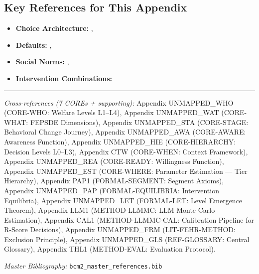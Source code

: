\subsection{Key References for This Appendix}

\begin{itemize}[nosep]
    \item \textbf{Choice Architecture:} \citet{thalersunstein2008}, \citet{johnson2012}
    \item \textbf{Defaults:} \citet{madrian2001}, \citet{chetty2014}
    \item \textbf{Social Norms:} \citet{allcott2011}, \citet{cialdini2003}
    \item \textbf{Intervention Combinations:} \citet{johnson2021}
\end{itemize}

\nocite{bcm_master}



\vspace{1em}
\hrule
\vspace{0.5em}

\noindent\textit{Cross-references (7 COREs + supporting):}
Appendix UNMAPPED_WHO (CORE-WHO: Welfare Levels L1--L4),
Appendix UNMAPPED_WAT (CORE-WHAT: FEPSDE Dimensions),
Appendix UNMAPPED_STA (CORE-STAGE: Behavioral Change Journey),
Appendix UNMAPPED_AWA (CORE-AWARE: Awareness Function),
Appendix UNMAPPED_HIE (CORE-HIERARCHY: Decision Levels L0--L3),
Appendix CTW (CORE-WHEN: Context Framework),
Appendix UNMAPPED_REA (CORE-READY: Willingness Function),
Appendix UNMAPPED_EST (CORE-WHERE: Parameter Estimation --- Tier Hierarchy),
Appendix PAP1 (FORMAL-SEGMENT: Segment Axioms),
Appendix UNMAPPED_PAP (FORMAL-EQUILIBRIA: Intervention Equilibria),
Appendix UNMAPPED_LET (FORMAL-LET: Level Emergence Theorem),
Appendix LLM1 (METHOD-LLMMC: LLM Monte Carlo Estimation),
Appendix CAL1 (METHOD-LLMMC-CAL: Calibration Pipeline for R-Score Decisions),
Appendix UNMAPPED_FRM (LIT-FEHR-METHOD: Exclusion Principle),
Appendix UNMAPPED_GLS (REF-GLOSSARY: Central Glossary),
Appendix THL1 (METHOD-EVAL: Evaluation Protocol).

\noindent\textit{Master Bibliography:} \texttt{bcm2\_master\_references.bib}


